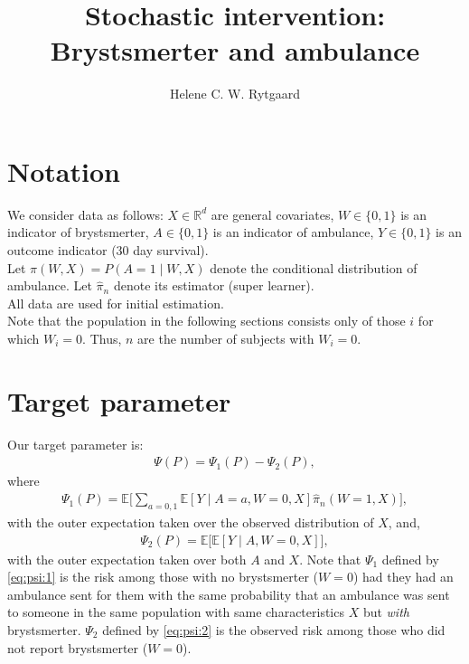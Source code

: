 \documentclass{article}
\title{Stochastic intervention: Brystsmerter and ambulance}
\author{Helene C. W. Rytgaard}
\newcommand{\EE}{\mathbb{E}}
\newcommand{\R}{\mathbb{R}}
\newcommand{\1}{\mathbb{1}}
\begin{document}
\maketitle



\section{Notation}

We consider data as follows: \(X\in \R^d\) are general covariates,
\(W\in\lbrace 0,1\rbrace\) is an indicator of brystsmerter,
\(A\in \lbrace 0,1\rbrace\) is an indicator of ambulance,
\(Y\in\lbrace 0,1\rbrace\) is an outcome indicator (30 day survival).\\

Let \(\pi( W, X )= P(A=1 \mid  W, X)\) denote the conditional
distribution of ambulance. Let \(\hat{\pi}_n\) denote its estimator
(super learner).  \\

All data are used for initial estimation. \\

Note that the population in the following sections consists only of
those \(i\) for which \(W_i = 0\). Thus, \(n\) are the number of
subjects with \(W_i=0\).


\section{Target parameter}

Our target parameter is:
\begin{align*}
  \Psi(P)  = \Psi_1 (P) - \Psi_2 (P) ,
\end{align*}
where
\begin{align}
  \Psi_1 (P)  = \EE\bigg[ \sum_{a=0,1}\EE [Y \mid A=a, W=0, X]
  \hat{\pi}_n ( W=1, X) \bigg],
  \label{eq:psi:1}
\end{align}
with the outer expectation taken over the observed distribution of
\(X\), and,
\begin{align}
  \Psi_2 (P) = \EE\big[ \EE [Y \mid A, W=0, X]
  \big],
    \label{eq:psi:2}
\end{align}
with the outer expectation taken over both \(A\) and \(X\). Note that
\(\Psi_1\) defined by \eqref{eq:psi:1} is the risk among those with no
brystsmerter (\(W=0\)) had they had an ambulance sent for them with
the same probability that an ambulance was sent to someone in the same
population with same characteristics \(X\) but \textit{with}
brystsmerter.  \(\Psi_2\) defined by \eqref{eq:psi:2} is the observed
risk among those who did not report brystsmerter (\(W=0\)).
\end{document}
